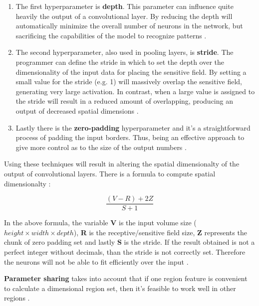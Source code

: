 \begin{enumerate}
    \item The first hyperparameter is  \textbf{depth}. This parameter can influence quite heavily the output of a convolutional layer. By reducing the depth will automatically minimize the overall number of neurons in the network, but sacrificing the capabilities of the model to recognize patterns \cite{IntroCNN}.
    \item The second hyperparameter, also used in pooling layers, is \textbf{stride}. The programmer can define the stride in which to set the depth over the dimensionality of the input data for placing the sensitive field. By setting a small value for the stride (e.g. 1) will massively overlap the sensitive field, generating very large activation. In contrast, when a large value is assigned to the stride will result in a reduced amount of overlapping, producing an output of decreased spatial dimensions \cite{IntroCNN}.
    \item Lastly there is the \textbf{zero-padding} hyperparameter and it's a straightforward process of padding the input borders. Thus, being an effective approach to give more control as to the size of the output numbers \cite{IntroCNN}.
\end{enumerate}

Using these techniques will result in altering the spatial dimensionalty of the output of convolutional layers. There is a formula to compute spatial dimensionalty \cite{IntroCNN}:

\begin{center}
    \begin{equation} 
        \frac{(V - R) + 2Z}{S + 1}
    \end{equation}
\end{center}

In the above formula, the variable \textbf{V} is the input volume size (\textit{$height\times width \times depth$}), \textbf{R} is the receptive/sensitive field size, \textbf{Z} represents the chunk of zero padding set and lastly \textbf{S} is the stride. If the result obtained is not a perfect integer without decimals, than the stride is not correctly set. Therefore the neurons will not be able to fit efficiently over the input \cite{IntroCNN, EvalPooling}. \par

\textbf{Parameter sharing} takes into account that if one region feature is convenient to calculate a dimensional region set, then it's feasible to work well in other regions \cite{IntroCNN}.   